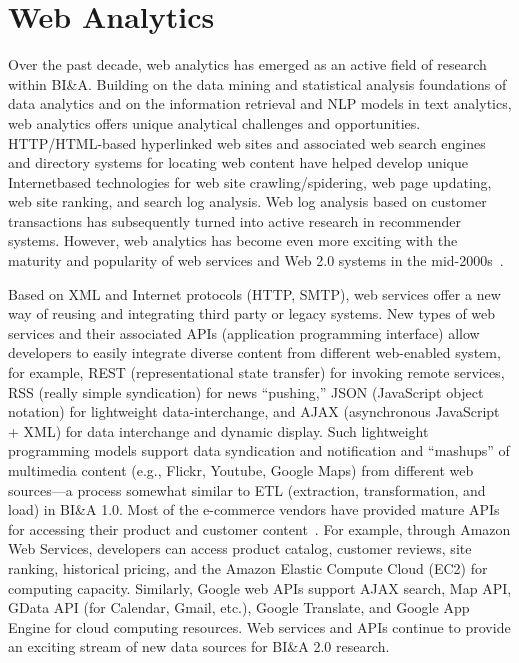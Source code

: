 \section*{Web Analytics}

Over the past decade, web analytics has emerged as an active
field of research within BI\&A. Building on the data mining
and statistical analysis foundations of data analytics and on
the information retrieval and NLP models in text analytics,
web analytics offers unique analytical challenges and
opportunities. HTTP/HTML-based hyperlinked web sites and
associated web search engines and directory systems for
locating web content have helped develop unique Internetbased
technologies for web site crawling/spidering, web page
updating, web site ranking, and search log analysis. Web log
analysis based on customer transactions has subsequently
turned into active research in recommender systems. However,
web analytics has become even more exciting with the
maturity and popularity of web services and Web 2.0 systems
in the mid-2000s~\cite{OReilly:2005}. 

Based on XML and Internet protocols (HTTP, SMTP), web
services offer a new way of reusing and integrating third party
or legacy systems. New types of web services and their
associated APIs (application programming interface) allow
developers to easily integrate diverse content from different
web-enabled system, for example, REST (representational
state transfer) for invoking remote services, RSS (really
simple syndication) for news “pushing,” JSON (JavaScript
object notation) for lightweight data-interchange, and AJAX
(asynchronous JavaScript + XML) for data interchange and
dynamic display. Such lightweight programming models
support data syndication and notification and “mashups” of
multimedia content (e.g., Flickr, Youtube, Google Maps)
from different web sources—a process somewhat similar to
ETL (extraction, transformation, and load) in BI\&A 1.0.
Most of the e-commerce vendors have provided mature APIs
for accessing their product and customer content~\cite{Schonfeld:2005}. For example, through Amazon Web Services, developers
can access product catalog, customer reviews, site
ranking, historical pricing, and the Amazon Elastic Compute
Cloud (EC2) for computing capacity. Similarly, Google web
APIs support AJAX search, Map API, GData API (for
Calendar, Gmail, etc.), Google Translate, and Google App
Engine for cloud computing resources. Web services and
APIs continue to provide an exciting stream of new data
sources for BI\&A 2.0 research.

